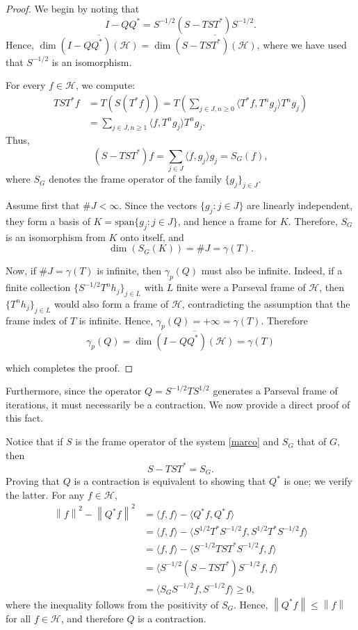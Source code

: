 \documentclass[a4paper,12pt]{amsart}
\def\HH{{\mathcal{H}}}
\newcommand{\norm}[1]{{\left\|{#1}\right\|}}
\newcommand{\scal}[1]{{\langle{#1}\rangle}}
\theoremstyle{definition}
\begin{document}
\begin{proof}
We begin by noting that 
\begin{equation*}
I-QQ^*=S^{-1/2} (S-T S T^*) S^{-1/2}.
\end{equation*}
Hence, $\dim\overline{(I-QQ^*)(\HH)}=\dim\overline{(S-T S T^*)(\HH)}$, where we have used that $S^{-1/2}$ is an isomorphism.

For every $f\in\HH$, we compute:
\begin{align*}
TST^*f&=T(S(T^* f))=T\left(\sum_{j\in J,n\geqslant0}\scal{T^*f,T^n g_j}T^n g_j\right)
\\
&=\sum_{j\in J,n\geqslant1}\scal{f,T^ng_j}T^n g_j.
\end{align*}
Thus,
\begin{equation*}
(S-T S T^*)f=\sum_{j\in J}\scal{f,g_j}g_j=S_G(f),
\end{equation*}
where $S_G$ denotes the frame operator of the family $\{g_j\}_{j\in J}$.

Assume first that $\#J <\infty$. Since the vectors $\{g_j:j\in J\}$ are linearly independent, they form a basis of $K=\text{span}\{g_j:j\in J\}$, and hence a frame for $K$. Therefore, $S_G$ is an isomorphism from $K$ onto itself, and
\begin{equation*}
\dim (S_G(K))=\#J=\gamma(T).
\end{equation*}

Now, if $\#J=\gamma(T)$ is infinite, then $\gamma_p(Q)$ must also be infinite. Indeed, if a finite collection $\{S^{-1/2} T^n h_j\}_{j\in L}$ with $L$ finite were a Parseval frame of $\HH$, then $\{T^n h_j\}_{j\in L}$ would also form a frame of $\HH$, contradicting the assumption that the frame index of $T$ is infinite. Hence, $\gamma_p(Q)=+\infty=\gamma(T)$.
Therefore 
\[
\gamma_p(Q)=\dim\overline{(I-QQ^*)(\HH)} = \gamma(T)
\]

which completes the proof.
\end{proof}

Furthermore, since the operator $Q=S^{-1/2} T S^{1/2}$ generates a Parseval frame of iterations, it must necessarily be a contraction. We now provide a direct proof of this fact.

Notice that if $S$ is the frame operator of the system \eqref{marco} and $S_G$ that of $G$, then
\begin{equation*}
S-T S T^*=S_G.
\end{equation*}
Proving that $Q$ is a contraction is equivalent to showing that $Q^*$ is one; we verify the latter. For any $f\in\HH$,
\begin{align*}
\norm{f}^2-\norm{Q^* f}^2&=\scal{f,f}-\scal{Q^* f, Q^* f}
\\
&=\scal{f,f}-\scal{S^{1/2}T^*S^{-1/2}f,S^{1/2} T^* S^{-1/2} f}
\\
&=\scal{f,f}-\scal{S^{-1/2}TST^*S^{-1/2}f,f}
\\
&=\scal{S^{-1/2}(S-T S T^*)S^{-1/2}f,f}
\\
&=\scal{S_G S^{-1/2}f,S^{-1/2}f}\geqslant0,
\end{align*}
where the inequality follows from the positivity of $S_G$. Hence, $\norm{Q^* f}\leqslant\norm{f}$ for all $f\in\HH$, and therefore $Q$ is a contraction.
\end{document}
